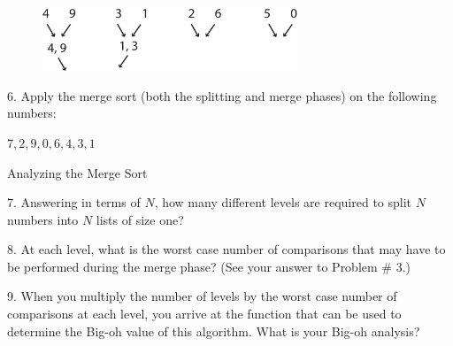 \documentclass[11pt]{article}
\begin{document}
\begin{figure}[h]
\centerline {
\includegraphics[width=3in]{merge-2.pdf}
}
\end{figure}

\vspace*{1.5in}
6. Apply the merge sort (both the splitting and merge phases) on the following numbers:

\begin{center}$7, 2, 9, 0, 6, 4, 3, 1$\end{center}


\vspace*{2in}

Analyzing the Merge Sort

7. Answering in terms of $N$, how many different levels are required to split $N$ numbers into $N$ lists of size one?

8. At each level, what is the worst case number of comparisons that may have to be performed during the merge phase? (See your answer to Problem \# 3.) 

9. When you multiply the number of levels by the worst case number of comparisons at each level, you arrive at the function that can be used to determine the Big-oh value of this algorithm. What is your Big-oh analysis?



 
\end{document}
